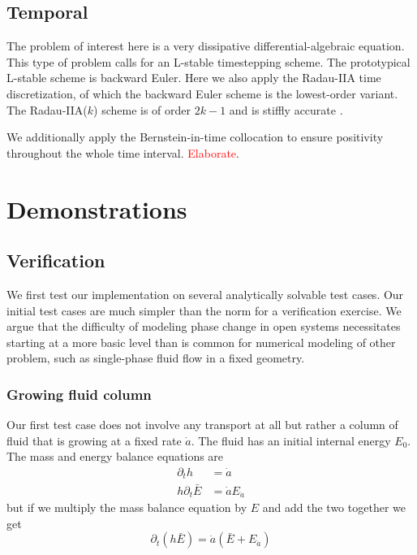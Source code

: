 \documentclass{article}
\theoremstyle{definition}
\theoremstyle{plain}
\begin{document}
\subsection{Temporal}

The problem of interest here is a very dissipative differential-algebraic equation.
This type of problem calls for an L-stable timestepping scheme.
The prototypical L-stable scheme is backward Euler.
Here we also apply the Radau-IIA time discretization, of which the backward Euler scheme is the lowest-order variant.
The Radau-IIA($k$) scheme is of order $2k - 1$ and is stiffly accurate \citep{hairer1996solving}.

We additionally apply the Bernstein-in-time collocation to ensure positivity throughout the whole time interval.
\textcolor{red}{Elaborate}.



\section{Demonstrations}

\subsection{Verification}

We first test our implementation on several analytically solvable test cases.
Our initial test cases are much simpler than the norm for a verification exercise.
We argue that the difficulty of modeling phase change in open systems necessitates starting at a more basic level than is common for numerical modeling of other problem, such as single-phase fluid flow in a fixed geometry.

\subsubsection{Growing fluid column}
Our first test case does not involve any transport at all but rather a column of fluid that is growing at a fixed rate $\dot a$.
The fluid has an initial internal energy $E_0$.
The mass and energy balance equations are
\begin{align}
    \partial_t h & = \dot a \\
    h\partial_t \bar E & = \dot a E_{\dot a}
\end{align}
but if we multiply the mass balance equation by $E$ and add the two together we get
\begin{equation}
    \partial_t(h\bar E) = \dot a(\bar E + E_{\dot a})
\end{equation}
\end{document}
